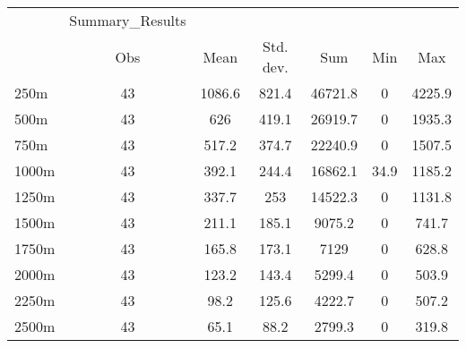 \begin{tabular}{l*{6}{c}}
\hline\hline
            &Summary\_Results&            &            &            &            &            \\
            &         Obs&        Mean&   Std. dev.&         Sum&         Min&         Max\\
\hline
250m        &          43&      1086.6&       821.4&     46721.8&           0&      4225.9\\
500m        &          43&         626&       419.1&     26919.7&           0&      1935.3\\
750m        &          43&       517.2&       374.7&     22240.9&           0&      1507.5\\
1000m       &          43&       392.1&       244.4&     16862.1&        34.9&      1185.2\\
1250m       &          43&       337.7&         253&     14522.3&           0&      1131.8\\
1500m       &          43&       211.1&       185.1&      9075.2&           0&       741.7\\
1750m       &          43&       165.8&       173.1&        7129&           0&       628.8\\
2000m       &          43&       123.2&       143.4&      5299.4&           0&       503.9\\
2250m       &          43&        98.2&       125.6&      4222.7&           0&       507.2\\
2500m       &          43&        65.1&        88.2&      2799.3&           0&       319.8\\
\hline\hline
\end{tabular}

